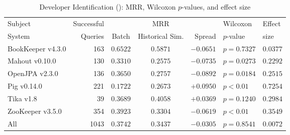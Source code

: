 \begin{table}[t]
\centering
\caption{Developer Identification (\dtwo): MRR, Wilcoxon $p$-values, and effect size}
\begin{tabular}{l|r|ccr|ll}
\toprule
Subject & Successful &    & MRR &        & Wilcoxon  & Effect \\
System  & Queries    & Batch & Historical Sim.  & Spread & $p$-value & size \\
\midrule
BookKeeper v4.3.0 & 163 & $\bm{0.6522}$ & $0.5871$ & $-0.0651$ & $p = 0.7327$ & $0.0377$ \\
Mahout v0.10.0 & 130 & $\bm{0.3310}$ & $0.2575$ & $-0.0735$ & $p = 0.0273$ & $0.2292$ \\
OpenJPA v2.3.0 & 136 & $\bm{0.3650}$ & $0.2757$ & $-0.0892$ & $p = 0.0184$ & $0.2515$ \\
Pig v0.14.0 & 221 & $0.1722$ & $\bm{0.2673}$ & $+0.0950$ & $p < 0.01$ & $0.7254$ \\
Tika v1.8 & 39 & $0.3689$ & $\bm{0.4058}$ & $+0.0369$ & $p = 0.1240$ & $0.2984$ \\
ZooKeeper v3.5.0 & 354 & $\bm{0.3923}$ & $0.3304$ & $-0.0619$ & $p < 0.01$ & $0.3549$ \\
\midrule
All & 1043 & $\bm{0.3742}$ & $0.3437$ & $-0.0305$ & $p = 0.8541$ & $0.0072$ \\
\bottomrule
\end{tabular}
\label{table:triage_rq2}
\end{table}
